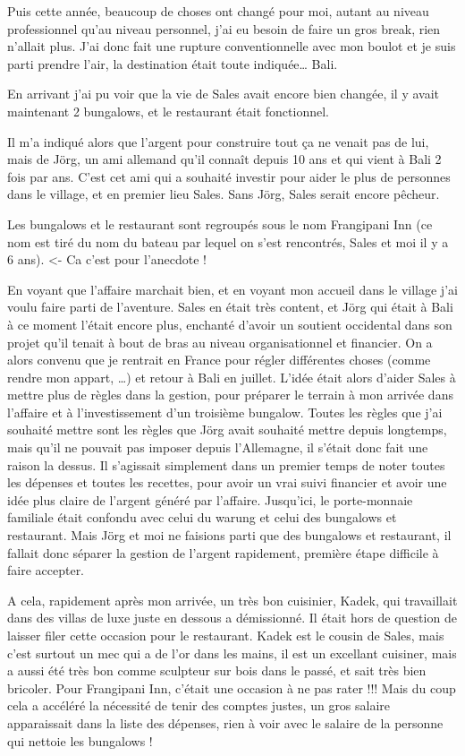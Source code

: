 \begin{multicols}{2}
Puis cette année, beaucoup de choses ont changé pour moi, autant au niveau professionnel qu’au niveau personnel, j’ai eu besoin de faire un gros break, rien n’allait plus. J’ai donc fait une rupture conventionnelle avec mon boulot et je suis parti prendre l’air, la destination était toute indiquée… Bali.

En arrivant j’ai pu voir que la vie de Sales avait encore bien changée, il y avait maintenant 2 bungalows, et le restaurant était fonctionnel.

Il m’a indiqué alors que l’argent pour construire tout ça ne venait pas de lui, mais de Jörg, un ami allemand qu’il connaît depuis 10 ans et qui vient à Bali 2 fois par ans. C’est cet ami qui a souhaité investir pour aider le plus de personnes dans le village, et en premier lieu Sales. Sans Jörg, Sales serait encore pêcheur.

Les bungalows et le restaurant sont regroupés sous le nom Frangipani Inn (ce nom est tiré du nom du bateau par lequel on s’est rencontrés, Sales et moi il y a 6 ans). <- Ca c’est pour l’anecdote !

En voyant que l’affaire marchait bien, et en voyant mon accueil dans le village j’ai voulu faire parti de l’aventure. Sales en était très content, et Jörg qui était à Bali à ce moment l’était encore plus, enchanté d’avoir un soutient occidental dans son projet qu’il tenait à bout de bras au niveau organisationnel et financier. On a alors convenu que je rentrait en France pour régler différentes choses (comme rendre mon appart, …) et retour à Bali en juillet. L’idée était alors d’aider Sales à mettre plus de règles dans la gestion, pour préparer le terrain à mon arrivée dans l’affaire et à l’investissement d’un troisième bungalow. Toutes les règles que j’ai souhaité mettre sont les règles que Jörg avait souhaité mettre depuis longtemps, mais qu’il ne pouvait pas imposer depuis l’Allemagne, il s’était donc fait une raison la dessus. Il s’agissait simplement dans un premier temps de noter toutes les dépenses et toutes les recettes, pour avoir un vrai suivi financier et avoir une idée plus claire de l’argent généré par l’affaire. Jusqu’ici, le porte-monnaie familiale était confondu avec celui du warung et celui des bungalows et restaurant. Mais Jörg et moi ne faisions parti que des bungalows et restaurant, il fallait donc séparer la gestion de l’argent rapidement, première étape difficile à faire accepter.

A cela, rapidement après mon arrivée, un très bon cuisinier, Kadek, qui travaillait dans des villas de luxe juste en dessous a démissionné. Il était hors de question de laisser filer cette occasion pour le restaurant. Kadek est le cousin de Sales, mais c’est surtout un mec qui a de l’or dans les mains, il est un excellant cuisiner, mais a aussi été très bon comme sculpteur sur bois dans le passé, et sait très bien bricoler. Pour Frangipani Inn, c’était une occasion à ne pas rater !!! Mais du coup cela a accéléré la nécessité de tenir des comptes justes, un gros salaire apparaissait dans la liste des dépenses, rien à voir avec le salaire de la personne qui nettoie les bungalows !


\end{multicols}
